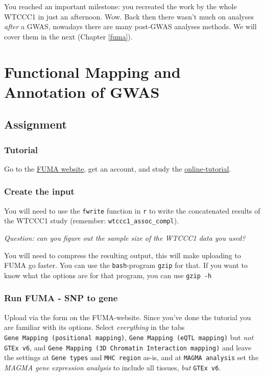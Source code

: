 \documentclass[
]{book}
\begin{document}
You reached an important milestone: you recreated the work by the whole WTCCC1 in just an afternoon. Wow. Back then there wasn't much on analyses \emph{after} a GWAS, nowadays there are many post-GWAS analyses methods. We will cover them in the next (Chapter \ref{fuma}).

\hypertarget{functional-mapping-and-annotation-of-gwas}{%
\chapter{Functional Mapping and Annotation of GWAS}\label{functional-mapping-and-annotation-of-gwas}}

\hypertarget{assignment}{%
\section{Assignment}\label{assignment}}

\hypertarget{tutorial}{%
\subsection{Tutorial}\label{tutorial}}

Go to the \href{https://fuma.ctglab.nl}{FUMA website}, get an account, and study the \href{https://fuma.ctglab.nl/tutorial}{online-tutorial}.

\hypertarget{create-the-input}{%
\subsection{Create the input}\label{create-the-input}}

You will need to use the \texttt{fwrite} function in \texttt{r} to write the concatenated results of the WTCCC1 study (remember: \texttt{wtccc1\_assoc\_compl}).

\emph{Question: can you figure out the sample size of the WTCCC1 data you used?}

You will need to compress the resulting output, this will make uploading to FUMA go faster. You can use the \texttt{bash}-program \texttt{gzip} for that. If you want to know what the options are for that program, you can use \texttt{gzip\ -h}

\hypertarget{run-fuma---snp-to-gene}{%
\subsection{Run FUMA - SNP to gene}\label{run-fuma---snp-to-gene}}

Upload via the form on the FUMA-website. Since you've done the tutorial you are familiar with its options. Select \emph{everything} in the tabs \texttt{Gene\ Mapping\ (positional\ mapping)}, \texttt{Gene\ Mapping\ (eQTL\ mapping)} but \emph{not} \texttt{GTEx\ v6}, and \texttt{Gene\ Mapping\ (3D\ Chromatin\ Interaction\ mapping)} and leave the settings at \texttt{Gene\ types} and \texttt{MHC\ region} as-is, and at \texttt{MAGMA\ analysis} set the \emph{MAGMA gene expression analysis} to include all tissues, \emph{but} \texttt{GTEx\ v6}.
\end{document}
